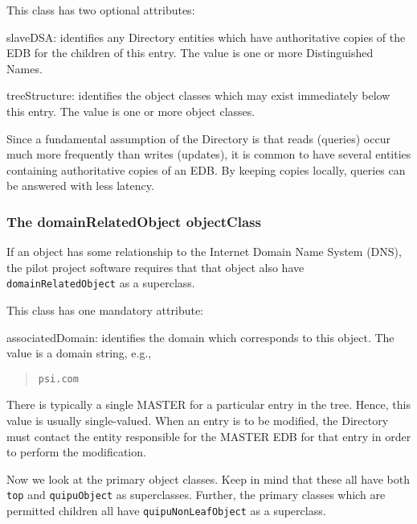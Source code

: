 This class has two optional attributes:
\begin{describe}
\item[slaveDSA:]
			identifies any Directory entities which have
			authoritative copies of the EDB for the children
			of this entry.
			The value is one or more Distinguished Names.

\item[treeStructure:]
			identifies the object classes which may exist
			immediately below this entry.
			The value is one or more object classes.
\end{describe}
Since a fundamental assumption of the Directory is that reads (queries)
occur much more frequently than writes (updates),
it is common to have several entities containing authoritative copies of an
EDB.
By keeping copies locally,
queries can be answered with less latency.

\subsubsection	{The domainRelatedObject objectClass}
If an object has some relationship to the Internet Domain Name System (DNS),
the pilot project software requires that that object also have
\verb"domainRelatedObject" as a superclass.

This class has one mandatory attribute:
\begin{describe}
\item[associatedDomain:]
			identifies the domain which corresponds to this object.
			The value is a domain string, e.g.,
\begin{quote}\small\begin{verbatim}
psi.com
\end{verbatim}\end{quote}
\end{describe}
There is typically a single MASTER for a particular entry in the tree.
Hence, this value is usually single-valued.
When an entry is to be modified,
the Directory must contact the entity responsible for the MASTER EDB for
that entry in order to perform the modification.

Now we look at the primary object classes.
Keep in mind that these all have both \verb"top" and \verb"quipuObject" as
superclasses.
Further,
the primary classes which are permitted children all have
\verb"quipuNonLeafObject" as a superclass.

